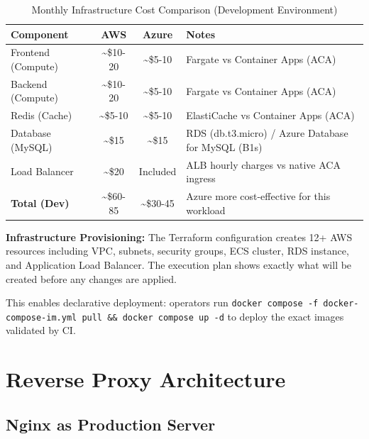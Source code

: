 \begin{table}[H]
    \centering
    \renewcommand{\arraystretch}{1.3}
    \begin{tabular}{|p{}|c|c|p{}|}
        \hline
        \textbf{Component} & \textbf{AWS} & \textbf{Azure} & \textbf{Notes} \\
        \hline
        Frontend (Compute) & \textasciitilde\$10-20 & \textasciitilde\$5-10 & Fargate vs Container Apps (ACA) \\
        \hline
        Backend (Compute) & \textasciitilde\$10-20 & \textasciitilde\$5-10 & Fargate vs Container Apps (ACA) \\
        \hline
        Redis (Cache) & \textasciitilde\$5-10 & \textasciitilde\$5-10 & ElastiCache vs Container Apps (ACA) \\
        \hline
        Database (MySQL) & \textasciitilde\$15 & \textasciitilde\$15 & RDS (db.t3.micro) / Azure Database for MySQL (B1s) \\
        \hline
        Load Balancer & \textasciitilde\$20 & Included & ALB hourly charges vs native ACA ingress \\
        \hline
        \textbf{Total (Dev)} & \textasciitilde\$60-85 & \textasciitilde\$30-45 & Azure more cost-effective for this workload \\
        \hline
    \end{tabular}
    \caption{Monthly Infrastructure Cost Comparison (Development Environment)}
    \label{tab:cloud_costs}
\end{table}

\textbf{Infrastructure Provisioning:} The Terraform configuration creates 12+ AWS resources including VPC, subnets, security groups, ECS cluster, RDS instance, and Application Load Balancer. The execution plan shows exactly what will be created before any changes are applied.


This enables declarative deployment: operators run \texttt{docker compose -f docker-compose-im.yml pull \&\& docker compose up -d} to deploy the exact images validated by CI.

\section{Reverse Proxy Architecture}
\label{sec:reverse-proxy}

\subsection{Nginx as Production Server}

